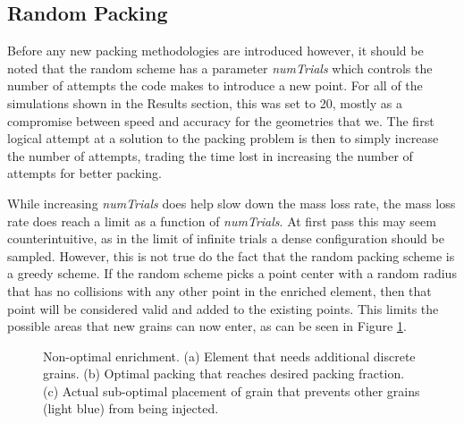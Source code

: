 \subsection{Random Packing}
Before any new packing methodologies are introduced however, it should be noted that the random scheme has a parameter \textit{numTrials} which controls the number of attempts the code makes to introduce a new point. For all of the simulations shown in the Results section, this was set to 20, mostly as a compromise between speed and accuracy for the geometries that we. The first logical attempt at a solution to the packing problem is then to simply increase the number of attempts, trading the time lost in increasing the number of attempts for better packing. 

While increasing \textit{numTrials} does help slow down the mass loss rate, the mass loss rate does reach a limit as a function of \textit{numTrials}. At first pass this may seem counterintuitive, as in the limit of infinite trials a dense configuration should be sampled. However, this is not true do the fact that the random packing scheme is a greedy scheme. If the random scheme picks a point center with a random radius that has no collisions with any other point in the enriched element, then that point will be considered valid and added to the existing points. This limits the possible areas that new grains can now enter, as can be seen in Figure \ref{greedy_dem}. 

\begin{figure}[htp] 
    \centering
    \caption{Non-optimal enrichment. (a) Element that needs additional discrete grains. (b) Optimal packing that reaches desired packing fraction. (c) Actual sub-optimal placement of grain that prevents other grains (light blue) from being injected.}%
    \label{greedy_dem}
\end{figure}

